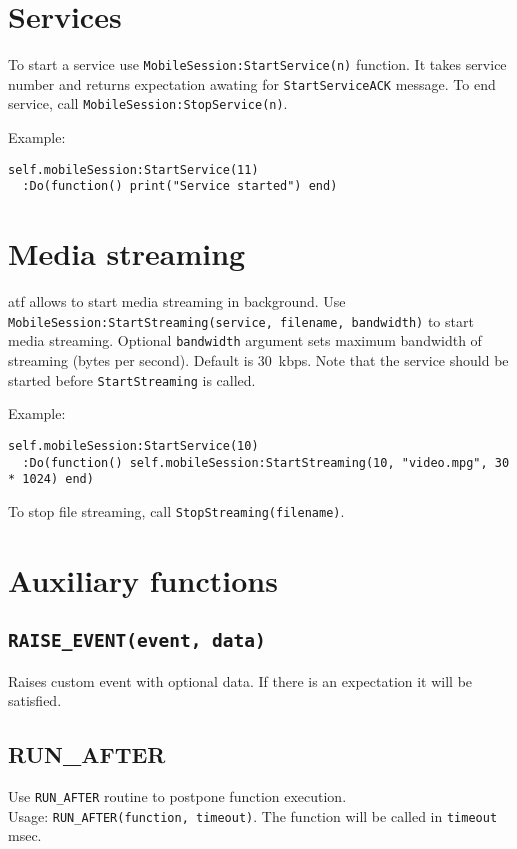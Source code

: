 \documentclass{article}
\begin{document}
\section{Services}
To start a service use {\tt MobileSession:StartService(n)} function.
It takes service number and returns expectation awating for
{\tt StartServiceACK} message.
To end service, call {\tt MobileSession:StopService(n)}.

Example:
\begin{lstlisting}
self.mobileSession:StartService(11)
  :Do(function() print("Service started") end)
\end{lstlisting}

\section{Media streaming}
{\sc atf} allows to start media streaming in background.
Use {\tt MobileSession:StartStreaming(service, filename, bandwidth)} to start media streaming.
Optional {\tt bandwidth} argument sets maximum bandwidth of streaming (bytes per second).
Default is 30~kbps.
Note that the service should be started before {\tt StartStreaming} is called.

Example:
\begin{lstlisting}
self.mobileSession:StartService(10)
  :Do(function() self.mobileSession:StartStreaming(10, "video.mpg", 30 * 1024) end)
\end{lstlisting}
To stop file streaming, call {\tt StopStreaming(filename)}.
\section{Auxiliary functions}
\subsection{\tt RAISE\_EVENT(event, data)}
Raises custom event with optional data. If there is an expectation it will be satisfied.
\subsection{RUN\_AFTER}
Use {\tt RUN\_AFTER} routine to postpone function execution.\\
Usage: {\tt RUN\_AFTER(function, timeout)}.
The function will be called in {\tt timeout} msec.
\end{document}
